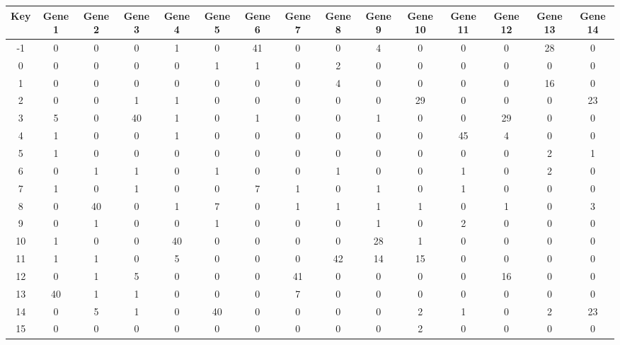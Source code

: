 \begin{tabular}{|c|c|c|c|c|c|c|c|c|c|c|c|c|c|c|}
\hline
Key & Gene 1 & Gene 2 & Gene 3 & Gene 4 & Gene 5 & Gene 6 & Gene 7 & Gene 8 & Gene 9 & Gene 10 & Gene 11 & Gene 12 & Gene 13 & Gene 14 \\
\hline
-1 & 0 & 0 & 0 & 1 & 0 & 41 & 0 & 0 & 4 & 0 & 0 & 0 & 28 & 0 \\
0 & 0 & 0 & 0 & 0 & 1 & 1 & 0 & 2 & 0 & 0 & 0 & 0 & 0 & 0 \\
1 & 0 & 0 & 0 & 0 & 0 & 0 & 0 & 4 & 0 & 0 & 0 & 0 & 16 & 0 \\
2 & 0 & 0 & 1 & 1 & 0 & 0 & 0 & 0 & 0 & 29 & 0 & 0 & 0 & 23 \\
3 & 5 & 0 & 40 & 1 & 0 & 1 & 0 & 0 & 1 & 0 & 0 & 29 & 0 & 0 \\
4 & 1 & 0 & 0 & 1 & 0 & 0 & 0 & 0 & 0 & 0 & 45 & 4 & 0 & 0 \\
5 & 1 & 0 & 0 & 0 & 0 & 0 & 0 & 0 & 0 & 0 & 0 & 0 & 2 & 1 \\
6 & 0 & 1 & 1 & 0 & 1 & 0 & 0 & 1 & 0 & 0 & 1 & 0 & 2 & 0 \\
7 & 1 & 0 & 1 & 0 & 0 & 7 & 1 & 0 & 1 & 0 & 1 & 0 & 0 & 0 \\
8 & 0 & 40 & 0 & 1 & 7 & 0 & 1 & 1 & 1 & 1 & 0 & 1 & 0 & 3 \\
9 & 0 & 1 & 0 & 0 & 1 & 0 & 0 & 0 & 1 & 0 & 2 & 0 & 0 & 0 \\
10 & 1 & 0 & 0 & 40 & 0 & 0 & 0 & 0 & 28 & 1 & 0 & 0 & 0 & 0 \\
11 & 1 & 1 & 0 & 5 & 0 & 0 & 0 & 42 & 14 & 15 & 0 & 0 & 0 & 0 \\
12 & 0 & 1 & 5 & 0 & 0 & 0 & 41 & 0 & 0 & 0 & 0 & 16 & 0 & 0 \\
13 & 40 & 1 & 1 & 0 & 0 & 0 & 7 & 0 & 0 & 0 & 0 & 0 & 0 & 0 \\
14 & 0 & 5 & 1 & 0 & 40 & 0 & 0 & 0 & 0 & 2 & 1 & 0 & 2 & 23 \\
15 & 0 & 0 & 0 & 0 & 0 & 0 & 0 & 0 & 0 & 2 & 0 & 0 & 0 & 0 \\
\hline
\end{tabular}